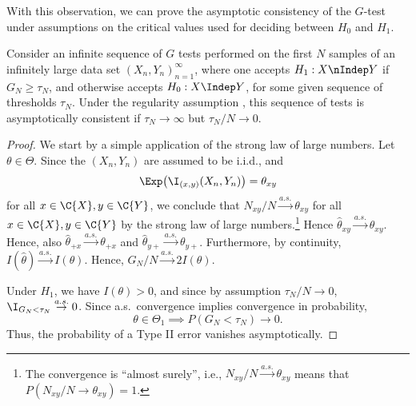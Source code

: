 With this observation, we can prove the asymptotic consistency of the $G$-test under assumptions on the critical values used
for deciding between $H_0$ and $H_1$. 
\begin{Cor}\label{cor:G_test_consistency}
Consider an infinite sequence of $G$ tests performed on the first $N$ samples of an infinitely large
data set $(X_n,Y_n)_{n=1}^\infty$, where one 
accepts $H_1 : X \nIndep Y$ if $G_N \ge \tau_N$, and otherwise accepts $H_0 : X \Indep Y$, 
for some given sequence of thresholds $\tau_N$.
Under the regularity assumption , this sequence of tests is
asymptotically consistent if $\tau_N \to \infty$ but $\tau_N / N \to 0$.
\end{Cor}
\begin{proof}
We start by a simple application of the strong law of large numbers.
Let $\theta \in \Theta$. Since the $(X_n,Y_n)$ are assumed to be i.i.d., and 
  $$\Exp \big(\I_{(x,y)}(X_n,Y_n)\big) = \theta_{xy}$$
for all $x \in \C{X}, y \in \C{Y}$,
we conclude that $N_{xy} / N \stackrel{a.s.}{\to} \theta_{xy}$ for all $x \in \C{X}, y \in \C{Y}$
by the strong law of large numbers.\footnote{The convergence is ``almost surely'', 
i.e., $N_{xy} / N \stackrel{a.s.}{\to} \theta_{xy}$ means that
$P(N_{xy} / N \to \theta_{xy}) = 1$.}
Hence $\hat\theta_{xy} \stackrel{a.s.}{\to} \theta_{xy}$. Hence, also
$\hat\theta_{+ x} \stackrel{a.s.}{\to} \theta_{+ x}$ and
$\hat\theta_{y +} \stackrel{a.s.}{\to} \theta_{y +}$.
Furthermore, by continuity, $I(\hat\theta) \stackrel{a.s.}{\to} I(\theta)$.
Hence, $G_N / N \stackrel{a.s.}{\to} 2I(\theta)$. 
  
Under $H_1$, we have $I(\theta) > 0$,
and since by assumption $\tau_N / N \to 0$, 
$\I_{G_N < \tau_N} \stackrel{a.s.}{\to} 0$. 
Since a.s.\ convergence implies convergence in probability,
  $$\theta \in \Theta_1 \implies P(G_N < \tau_N) \to 0.$$
Thus, the probability of a Type II error vanishes asymptotically.


\end{proof}
